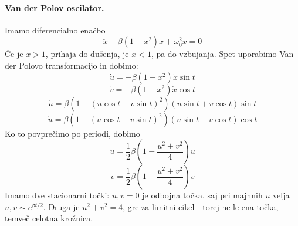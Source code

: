 \documentclass[a4paper]{article}
\begin{document}
\paragraph{Van der Polov oscilator.} Imamo diferencialno enačbo
$$\ddot x - \beta(1 - x^2)\dot x + \omega_0^2 x = 0$$
Če je $x > 1$, prihaja do dušenja, je $x < 1$, pa do vzbujanja. Spet uporabimo Van der Polovo transformacijo in dobimo:
$$\dot u = -\beta(1 - x^2)\dot x \sin t$$
$$\dot v = -\beta(1 - x^2)\dot x \cos t$$
$$\dot u = \beta\left(1 - (u\cos t - v\sin t)^2\right)(u\sin t + v\cos t)\sin t$$
$$\dot u = \beta\left(1 - (u\cos t - v\sin t)^2\right)(u\sin t + v\cos t)\cos t$$
Ko to povprečimo po periodi, dobimo
$$\dot u = \frac{1}{2}\beta \left(1 - \frac{u^2 + v^2}{4}\right)u$$
$$\dot v = \frac{1}{2}\beta \left(1 - \frac{u^2 + v^2}{4}\right)v$$
Imamo dve stacionarni točki: $u, v = 0$ je odbojna točka, saj pri majhnih $u$ velja $u, v \sim e^{\beta t / 2}$.
Druga je $u^2 + v^2 = 4$, gre za limitni cikel - torej ne le ena točka, temveč celotna krožnica.
\end{document}
